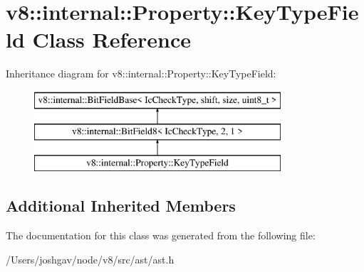 \hypertarget{classv8_1_1internal_1_1_property_1_1_key_type_field}{}\section{v8\+:\+:internal\+:\+:Property\+:\+:Key\+Type\+Field Class Reference}
\label{classv8_1_1internal_1_1_property_1_1_key_type_field}
Inheritance diagram for v8\+:\+:internal\+:\+:Property\+:\+:Key\+Type\+Field\+:\begin{figure}[H]
\begin{center}
\leavevmode
\includegraphics[height=3.000000cm]{classv8_1_1internal_1_1_property_1_1_key_type_field}
\end{center}
\end{figure}
\subsection*{Additional Inherited Members}


The documentation for this class was generated from the following file\+:\begin{DoxyCompactItemize}
\item 
/\+Users/joshgav/node/v8/src/ast/ast.\+h\end{DoxyCompactItemize}
